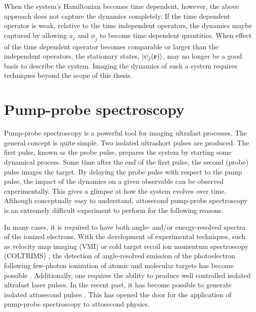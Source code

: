When the system's Hamiltonian becomes time dependent, however, the above approach does not capture the dynamics completely. If the time dependent operator is weak, relative to the time independent operators, the dynamics maybe captured by allowing $a_j$ and $\phi_j$ to become time dependent quantities. When effect of the time dependent operator becomes comparable or larger than the independent operators, the stationary states, $\ket{\psi_j(\mathbf{r})}$, may no longer be a good basis to describe the system. Imaging the dynamics of such a system requires techniques beyond the scope of this thesis.

\section{Pump-probe spectroscopy} %
\label{sec:pump_probe_spectroscopy}
Pump-probe spectroscopy is a powerful tool for imaging ultrafast processes. The general concept is quite simple. Two isolated ultrashort pulses are produced. The first pulse, known as the probe pulse, prepares the system by starting some dynamical process. Some time after the end of the first pulse, the second (probe) pulse images the target. By delaying the probe pulse with respect to the pump pulse, the impact of the dynamics on a given observable can be observed experimentally. This gives a glimpse at how the system evolves over time. Although conceptually easy to understand, attosecond pump-probe spectroscopy is an extremely difficult experiment to perform for the following reasons. 

In many cases, it is required to have both angle- and/or energy-resolved spectra of the ionized electrons. With the development of experimental techniques, such as velocity map imaging (VMI) \cite{kornilov2010,rouzee2011} or cold target recoil ion momentum spectroscopy (COLTRIMS) \cite{ullrich2003}, the detection of angle-resolved emission of the photoelectron following few-photon ionization of atomic and molecular targets has become possible \cite{ma2013}. 
Additionally, one requires the ability to produce well controlled isolated ultrafast laser pulses. In the recent past, it has become possible to generate isolated attosecond pulses \cite{frank2010}. This has opened the door for the application of pump-probe spectroscopy to attosecond physics. 

